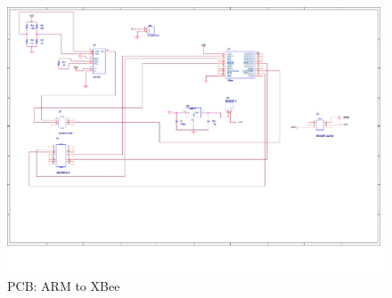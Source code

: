 \begin{figure}[H]
\begin{center}
\includegraphics[angle=90, scale = 0.5]{figures/ARM2XBee}
\end{center}
\caption{PCB: ARM to XBee}
\label{fig:ARM2XBee}
\end{figure}
